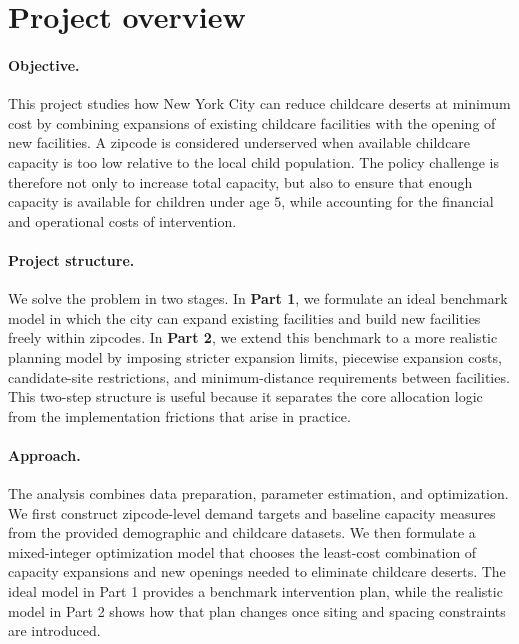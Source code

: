 \documentclass[11pt]{article}
\newcommand{\1}{\mathbb{I}}
\begin{document}


\section*{Project overview}


\paragraph{Objective.}
This project studies how New York City can reduce childcare deserts at minimum cost by combining expansions of existing childcare facilities with the opening of new facilities. A zipcode is considered underserved when available childcare capacity is too low relative to the local child population. The policy challenge is therefore not only to increase total capacity, but also to ensure that enough capacity is available for children under age \(5\), while accounting for the financial and operational costs of intervention.

\paragraph{Project structure.}
We solve the problem in two stages. In \textbf{Part 1}, we formulate an ideal benchmark model in which the city can expand existing facilities and build new facilities freely within zipcodes. In \textbf{Part 2}, we extend this benchmark to a more realistic planning model by imposing stricter expansion limits, piecewise expansion costs, candidate-site restrictions, and minimum-distance requirements between facilities. This two-step structure is useful because it separates the core allocation logic from the implementation frictions that arise in practice.

\paragraph{Approach.}
The analysis combines data preparation, parameter estimation, and optimization. We first construct zipcode-level demand targets and baseline capacity measures from the provided demographic and childcare datasets. We then formulate a mixed-integer optimization model that chooses the least-cost combination of capacity expansions and new openings needed to eliminate childcare deserts. The ideal model in Part 1 provides a benchmark intervention plan, while the realistic model in Part 2 shows how that plan changes once siting and spacing constraints are introduced.
\end{document}
